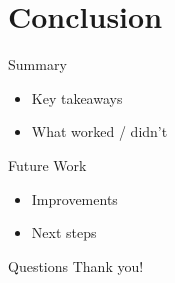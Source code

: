 \documentclass{beamer}
\begin{document}
\section{Conclusion}

\begin{frame}{Summary}
    \begin{itemize}
        \item Key takeaways
        \item What worked / didn’t
    \end{itemize}
\end{frame}

\begin{frame}{Future Work}
    \begin{itemize}
        \item Improvements
        \item Next steps
    \end{itemize}
\end{frame}

\begin{frame}{Questions}
    \centering
    \Large Thank you!
\end{frame}
\end{document}
